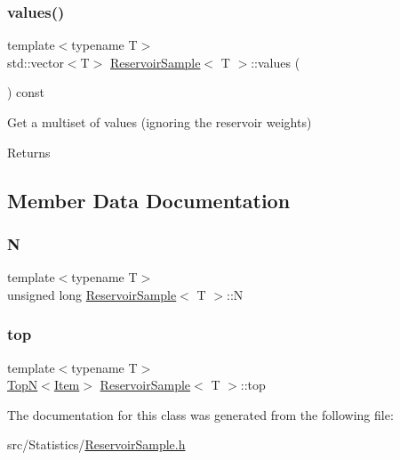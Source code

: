 \subsubsection{\texorpdfstring{values()}{values()}}
{\footnotesize\ttfamily template$<$typename T$>$ \\
std\+::vector$<$T$>$ \hyperlink{class_reservoir_sample}{Reservoir\+Sample}$<$ T $>$\+::values (\begin{DoxyParamCaption}{ }\end{DoxyParamCaption}) const\hspace{0.3cm}{\ttfamily [inline]}}



Get a multiset of values (ignoring the reservoir weights) 

\begin{DoxyReturn}{Returns}

\end{DoxyReturn}


\subsection{Member Data Documentation}
\mbox{\label{class_reservoir_sample_a33f6cc3a51f9591f6e25dacf0cf8e663}} 
\subsubsection{\texorpdfstring{N}{N}}
{\footnotesize\ttfamily template$<$typename T$>$ \\
unsigned long \hyperlink{class_reservoir_sample}{Reservoir\+Sample}$<$ T $>$\+::N}

\mbox{\label{class_reservoir_sample_a94a92f438328cbca4aa5f0ba92867142}} 
\subsubsection{\texorpdfstring{top}{top}}
{\footnotesize\ttfamily template$<$typename T$>$ \\
\hyperlink{class_top_n}{TopN}$<$\hyperlink{struct_reservoir_sample_1_1_item}{Item}$>$ \hyperlink{class_reservoir_sample}{Reservoir\+Sample}$<$ T $>$\+::top}



The documentation for this class was generated from the following file\+:\begin{DoxyCompactItemize}
\item 
src/\+Statistics/\hyperlink{_reservoir_sample_8h}{Reservoir\+Sample.\+h}\end{DoxyCompactItemize}
